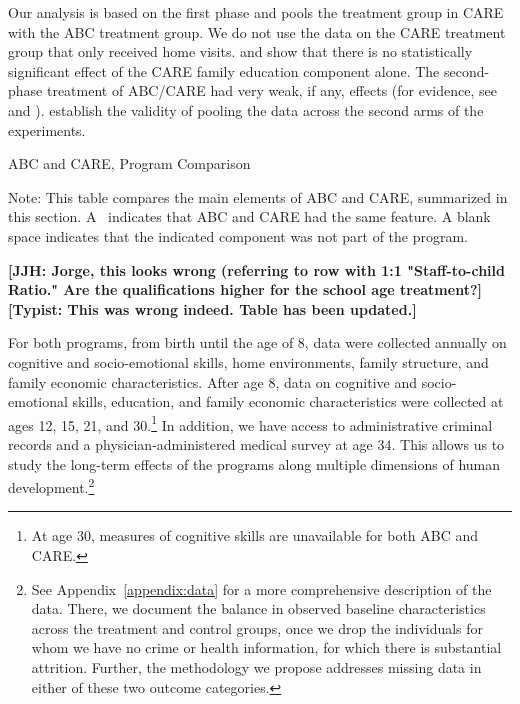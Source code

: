 Our analysis is based on the first phase and pools the treatment group in CARE with the ABC treatment group. We do not use the data on the CARE treatment group that only received home visits. \citet{Campbell_Conti_etal_2014_EarlyChildhoodInvestments} and \citet{ABCCARE_Dataset} show that there is no statistically significant effect of the CARE family education component alone. The second-phase treatment of ABC/CARE had very weak, if any, effects (for evidence, see \citealp{Campbell_Conti_etal_2014_EarlyChildhoodInvestments} and \citealp{ABCCARE_Dataset}). \citet{Campbell_Conti_etal_2014_EarlyChildhoodInvestments} establish the validity of pooling the data across the second arms of the experiments.

\begin{table}[!htbp]
\centering
\caption{ABC and CARE, Program Comparison} \label{tab:programcomparison}
\begin{adjustbox}{max width=\textwidth}
\begin{threeparttable}
	\small
	
\begin{tablenotes}
\small
\item Note: This table compares the main elements of ABC and CARE, summarized in this section. A \checkmark\ indicates that ABC and CARE had the same feature. A blank space indicates that the indicated component was not part of the program.
\end{tablenotes}
\end{threeparttable}
\end{adjustbox}

\textbf{[JJH: Jorge, this looks wrong (referring to row with 1:1 "Staff-to-child Ratio." Are the qualifications higher for the school age treatment?] [Typist: This was wrong indeed. Table has been updated.]}

\end{table}

For both programs, from birth until the age of 8, data were collected annually on cognitive and socio-emotional skills, home environments, family structure, and family economic characteristics. After age 8, data on cognitive and socio-emotional skills, education, and family economic characteristics were collected at ages 12, 15, 21, and 30.\footnote{At age 30, measures of cognitive skills are unavailable for both ABC and CARE.} In addition, we have access to administrative criminal records and a physician-administered medical survey at age 34. This allows us to study the long-term effects of the programs along multiple dimensions of human development.\footnote{See Appendix~\ref{appendix:data} for a more comprehensive description of the data. There, we document the balance in observed baseline characteristics across the treatment and control groups, once we drop the individuals for whom we have no crime or health information, for which there is substantial attrition. Further, the methodology we propose addresses missing data in either of these two outcome categories.}

